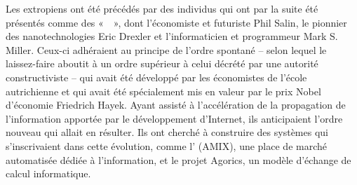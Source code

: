 Les extropiens ont été précédés par des individus qui ont par la suite été présentés comme des «~~», dont l'économiste et futuriste Phil Salin, le pionnier des nanotechnologies Eric Drexler et l'informaticien et programmeur Mark S. Miller. Ceux-ci adhéraient au principe de l'ordre spontané -- selon lequel le laissez-faire aboutit à un ordre supérieur à celui décrété par une autorité constructiviste -- qui avait été développé par les économistes de l'école autrichienne et qui avait été spécialement mis en valeur par le prix Nobel d'économie Friedrich Hayek. Ayant assisté à l'accélération de la propagation de l'information apportée par le développement d'Internet, ils anticipaient l'ordre nouveau qui allait en résulter. Ils ont cherché à construire des systèmes qui s'inscrivaient dans cette évolution, comme l' (AMIX), une place de marché automatisée dédiée à l'information, et le projet Agorics, un modèle d'échange de calcul informatique.

